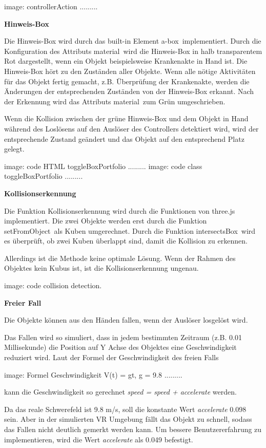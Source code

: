   image: controllerAction .........
  
  \textbf{Hinweis-Box}
  
  Die Hinweis-Box wird durch das built-in Element \glqq a-box\grqq\ implementiert. Durch die Konfiguration des Attributs \glqq material\grqq\ wird die Hinweis-Box in halb transparentem Rot dargestellt, wenn ein Objekt beispielsweise Krankenakte in Hand ist. Die Hinweis-Box hört zu den Zuständen aller Objekte. Wenn alle nötige Aktivitäten für das Objekt fertig gemacht, z.B. Überprüfung der Krankenakte, werden die Änderungen der entsprechenden Zuständen von der Hinweis-Box erkannt. Nach der Erkennung wird das Attributs \glqq material\grqq\ zum Grün umgeschrieben.
  
  Wenn die Kollision zwischen der grüne Hinweis-Box und dem Objekt in Hand während des Loslösens auf den Auslöser des Controllers detektiert wird, wird der entsprechende Zustand geändert und das Objekt auf den entsprechend Platz gelegt.
  
  image: code HTML toggleBoxPortfolio .........
  image: code class toggleBoxPortfolio .........
  
  \textbf{Kollisionserkennung}
  
  Die Funktion Kollisionserkennung wird durch die Funktionen von three.js implementiert. Die zwei Objekte werden erst durch die Funktion \glqq setFromObject\grqq\ als Kuben umgerechnet. Durch die Funktion \glqq intersectsBox\grqq\ wird es überprüft, ob zwei Kuben überlappt sind, damit die Kollision zu erkennen.
  
  Allerdings ist die Methode keine optimale Lösung. Wenn der Rahmen des Objektes kein Kubus ist, ist die Kollisionserkennung ungenau.
  
  image: code collision detection.
  
  \textbf{Freier Fall}
  
  Die Objekte können aus den Händen fallen, wenn der Auslöser losgelöst wird.
  
  Das Fallen wird so simuliert, dass in jedem bestimmten Zeitraum (z.B. 0.01 Millisekunde) die Position auf Y Achse des Objektes eine Geschwindigkeit reduziert wird. Laut der Formel der Geschwindigkeit des freien Falls 
  
  image: Formel Geschwindigkeit V(t) = gt, g = 9.8 .........
  
  kann die Geschwindigkeit so gerechnet \textit{speed = speed + accelerate} werden. 
  
  Da das reale Schwerefeld ist 9.8 m/s, soll die konstante Wert \textit{accelerate} 0.098 sein. Aber in der simulierten VR Umgebung fällt das Objekt zu schnell, sodass das Fallen nicht deutlich gemerkt werden kann. Um bessere Benutzererfahrung zu implementieren, wird die Wert \textit{accelerate} als 0.049 befestigt.
  
